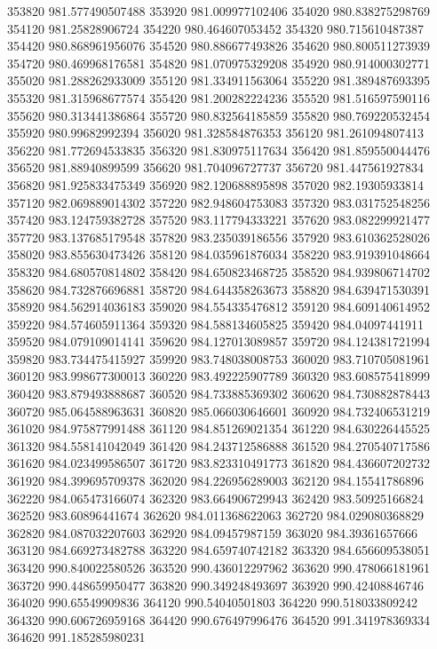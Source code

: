 {353820 981.577490507488
353920 981.009977102406
354020 980.838275298769
354120 981.25828906724
354220 980.464607053452
354320 980.715610487387
354420 980.868961956076
354520 980.886677493826
354620 980.800511273939
354720 980.469968176581
354820 981.070975329208
354920 980.914000302771
355020 981.288262933009
355120 981.334911563064
355220 981.389487693395
355320 981.315968677574
355420 981.200282224236
355520 981.516597590116
355620 980.313441386864
355720 980.832564185859
355820 980.769220532454
355920 980.99682992394
356020 981.328584876353
356120 981.261094807413
356220 981.772694533835
356320 981.830975117634
356420 981.859550044476
356520 981.88940899599
356620 981.704096727737
356720 981.447561927834
356820 981.925833475349
356920 982.120688895898
357020 982.19305933814
357120 982.069889014302
357220 982.948604753083
357320 983.031752548256
357420 983.124759382728
357520 983.117794333221
357620 983.082299921477
357720 983.137685179548
357820 983.235039186556
357920 983.610362528026
358020 983.855630473426
358120 984.035961876034
358220 983.919391048664
358320 984.680570814802
358420 984.650823468725
358520 984.939806714702
358620 984.732876696881
358720 984.644358263673
358820 984.639471530391
358920 984.562914036183
359020 984.554335476812
359120 984.609140614952
359220 984.574605911364
359320 984.588134605825
359420 984.04097441911
359520 984.079109014141
359620 984.127013089857
359720 984.124381721994
359820 983.734475415927
359920 983.748038008753
360020 983.710705081961
360120 983.998677300013
360220 983.492225907789
360320 983.608575418999
360420 983.879493888687
360520 984.733885369302
360620 984.730882878443
360720 985.064588963631
360820 985.066030646601
360920 984.732406531219
361020 984.975877991488
361120 984.851269021354
361220 984.630226445525
361320 984.558141042049
361420 984.243712586888
361520 984.270540717586
361620 984.023499586507
361720 983.823310491773
361820 984.436607202732
361920 984.399695709378
362020 984.226956289003
362120 984.15541786896
362220 984.065473166074
362320 983.664906729943
362420 983.50925166824
362520 983.60896441674
362620 984.011368622063
362720 984.029080368829
362820 984.087032207603
362920 984.09457987159
363020 984.39361657666
363120 984.669273482788
363220 984.659740742182
363320 984.656609538051
363420 990.840022580526
363520 990.436012297962
363620 990.478066181961
363720 990.448659950477
363820 990.349248493697
363920 990.42408846746
364020 990.65549909836
364120 990.54040501803
364220 990.518033809242
364320 990.606726959168
364420 990.676497996476
364520 991.341978369334
364620 991.185285980231
}
